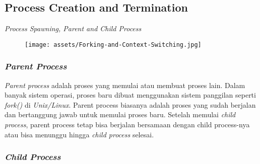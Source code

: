 \documentclass[12pt]{article}
\begin{document}
\subsection{Process Creation and Termination} 
\textit{Process Spawning, Parent and Child Process}
\begin{figure} [h]
        \centering
        \texttt{[image: assets/Forking-and-Context-Switching.jpg]}
        \label{fig:diagram}
\end{figure}
\subsubsection {\textit{Parent Process}}
    \textit{Parent process} adalah proses yang memulai atau membuat proses lain. Dalam banyak sistem operasi, proses baru dibuat menggunakan sistem panggilan seperti \textit{fork()} di \textit{Unix/Linux}. Parent process biasanya adalah proses yang sudah berjalan dan bertanggung jawab untuk memulai proses baru.
    Setelah memulai \textit{child process}, parent process tetap bisa berjalan bersamaan dengan child process-nya atau bisa menunggu hingga \textit{child process} selesai.

\subsubsection {\textit{Child Process}}
\end{document}
